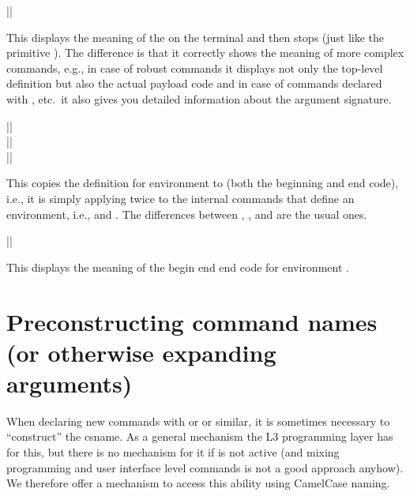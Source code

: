 \documentclass{ltxguide}
\begin{document}
\begin{decl}
  |\ShowCommand|       
\end{decl}

This displays the meaning of the  on the terminal and then
stops (just like the primitive ). The difference is that it
correctly shows the meaning of more complex commands, e.g., in case of
robust commands it displays not only the top-level definition but
also the actual payload code and in case of commands declared with
, etc.\ it also gives you detailed information
about the argument signature.

\begin{decl}
  |\NewEnvironmentCopy|         \\
  |\RenewEnvironmentCopy|       \\
  |\DeclareEnvironmentCopy|    
\end{decl}

This copies the definition for environment  to
 (both the beginning and end code), i.e., it is simply
applying  twice to the internal commands that
define an environment, i.e., \cs{} and .
The differences between , , and
 are the usual ones.

\begin{decl}
  |\ShowEnvironment|       
\end{decl}
This displays the meaning of the begin end end code for environment .




\section[Preconstructing command names \\ (or otherwise expanding arguments)]
        {Preconstructing command names (or otherwise expanding arguments)}
\label{sec:preconstructing-csnames}

When declaring new commands with  or
 or similar, it is sometimes necessary to
``construct'' the csname. As a general mechanism the L3 programming
layer has  for this, but there is no mechanism for
it if  is not active (and mixing programming and user
interface level commands is not a good approach anyhow). We therefore
offer a mechanism to access this ability using CamelCase naming.
\end{document}
